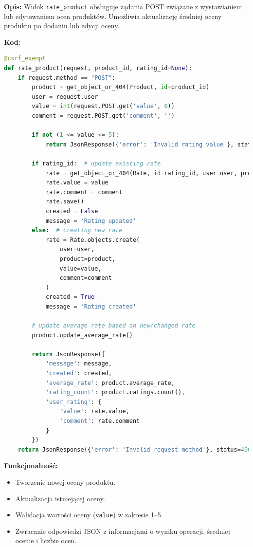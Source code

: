 \documentclass[12pt,a4paper,oneside]{article}
\theoremstyle{definition}
\numberwithin{equation}{section}
\begin{document}
\textbf{Opis:}  
Widok \texttt{rate\_product} obsługuje żądania POST związane z wystawianiem lub edytowaniem ocen produktów. Umożliwia aktualizację średniej oceny produktu po dodaniu lub edycji oceny.

\textbf{Kod:}
\begin{lstlisting}[language=Python]
@csrf_exempt
def rate_product(request, product_id, rating_id=None):
    if request.method == "POST":
        product = get_object_or_404(Product, id=product_id)
        user = request.user
        value = int(request.POST.get('value', 0))
        comment = request.POST.get('comment', '')

        if not (1 <= value <= 5):
            return JsonResponse({'error': 'Invalid rating value'}, status=400)

        if rating_id:  # update existing rate
            rate = get_object_or_404(Rate, id=rating_id, user=user, product=product)
            rate.value = value
            rate.comment = comment
            rate.save()
            created = False
            message = 'Rating updated'
        else:  # creating new rate
            rate = Rate.objects.create(
                user=user,
                product=product,
                value=value,
                comment=comment
            )
            created = True
            message = 'Rating created'

        # update average rate based on new/changed rate
        product.update_average_rate()

        return JsonResponse({
            'message': message,
            'created': created,
            'average_rate': product.average_rate,
            'rating_count': product.ratings.count(),
            'user_rating': {
                'value': rate.value,
                'comment': rate.comment
            }
        })
    return JsonResponse({'error': 'Invalid request method'}, status=400)
\end{lstlisting}

\textbf{Funkcjonalność:}
\begin{itemize}
    \item Tworzenie nowej oceny produktu.
    \item Aktualizacja istniejącej oceny.
    \item Walidacja wartości oceny (\texttt{value}) w zakresie 1–5.
    \item Zwracanie odpowiedzi JSON z informacjami o wyniku operacji, średniej ocenie i liczbie ocen.
\end{itemize}
\end{document}
